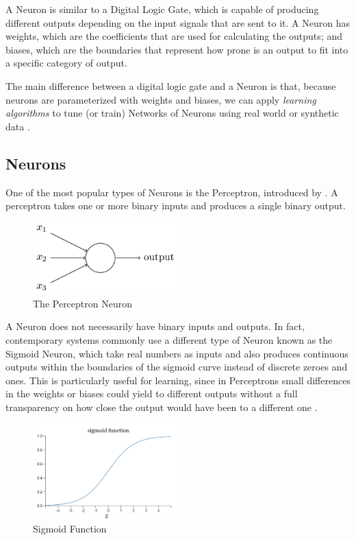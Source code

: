 \documentclass[openright]{normas-utf-tex} %
\begin{document}
A Neuron is similar to a Digital Logic Gate, which is capable of producing 
different outputs depending on the input signals that are sent to it.
A Neuron has weights, which are the coefficients that are used for calculating
the outputs; and biases, which are the boundaries that represent how prone is an output
to fit into a specific category of output. 

The main difference between a digital logic gate and a Neuron is that, because neurons are
parameterized with weights and biases, we can apply \textit{learning algorithms}
to tune (or train) Networks of Neurons using real world or synthetic data \cite{Nielsen2015}.

\subsection{Neurons}

One of the most popular types of Neurons is the Perceptron, introduced by 
\cite{Rosenblatt1958}. 
A perceptron takes one or more binary inputs and produces a single binary output.

\begin{figure}[H]
	\centering
	\includegraphics[width=0.5\textwidth]{./images/perceptron.png}
	\caption[The Perceptron Neuron]{The Perceptron Neuron}
	\label{fig:perceptron}
\end{figure}

A Neuron does not necessarily have binary inputs and outputs. In fact, 
contemporary systems commonly use a different type of Neuron known as the Sigmoid Neuron, 
which take real numbers as inputs and also produces continuous outputs 
within the boundaries of the sigmoid curve instead of discrete zeroes and ones. 
This is particularly useful for learning, since in Perceptrons small differences in the 
weights or biases could yield to different outputs without a full transparency 
on how close the output would have been to a different one \cite{Nielsen2015}.

\begin{figure}[H]
	\centering
	\includegraphics[width=0.5\textwidth]{./images/sigmoid-function.png}
	\caption[Sigmoid Function]{Sigmoid Function}
	\label{fig:sigmoid}
\end{figure}
\end{document}
